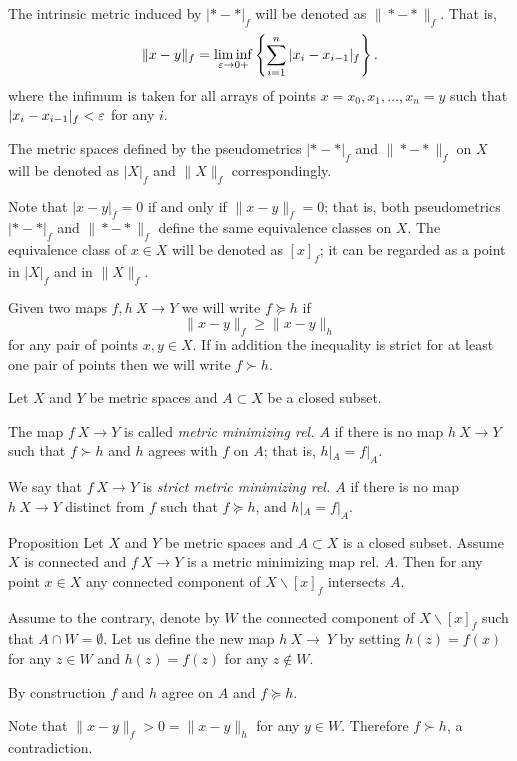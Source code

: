 \documentclass[a4paper,10pt]{amsart}
\begin{document}
The intrinsic metric induced by $|{*}-{*}|_f$ will be denoted as 
$\|{*}-{*}\|_f$. 
That is, 
\[\|x-y\|_f=\liminf_{\varepsilon\to0+}\left\{\sum_{i=1}^n|x_i-x_{i-1}|_f\right\}.\]
where the infimum is taken for all arrays of points 
$x=x_0,x_1,\dots,x_n=y$ such that 
$|x_i-x_{i-1}|_f<\varepsilon$ for any $i$.

The metric spaces defined by the pseudometrics $|{*}-{*}|_f$ 
and $\|{*}-{*}\|_f$ on $X$ will be denoted as $|X|_f$ and $\|X\|_f$ correspondingly.

Note that $|x-y|_f=0$ if and only if $\|x-y\|_f=0$;
that is,  both pseudometrics $|{*}-{*}|_f$ and  $\|{*}-{*}\|_f$
define the same equivalence classes on $X$.
The equivalence class of $x\in X$ will be denoted as $[x]_f$; 
it can be regarded as a point in  $|X|_f$ and in $\|X\|_f$.

Given two maps $f,h\:X\to Y$ we will write $f\succcurlyeq h$ if 
\[\|x-y\|_f\ge \|x-y\|_h\]
for any pair of points $x,y\in X$.
If in addition the inequality is strict for at least one pair of points then we will write $f\succ h$.

Let $X$ and $Y$ be metric spaces and $A\subset X$ be a closed subset.

The map $f\:X\to Y$ is called \emph{metric minimizing rel. $A$}
if there is no map $h\:X\to Y$ such that $f\succ h$
and $h$ agrees with $f$ on $A$;
that is, $h|_A=f|_A$.

We say that $f\:X\to Y$ is \emph{strict metric minimizing rel. $A$}
if there is no map $h\:X\to Y$ distinct from $f$
such that $f\succcurlyeq h$, 
and $h|_A=f|_A$.

\begin{thm}{Proposition}\label{prop:point-complement}
Let $X$ and $Y$ be  metric spaces 
and $A\subset X$ is a closed subset.
Assume $X$ is connected and $f\:X\to Y$ is a metric minimizing map rel. $A$.
Then for any point $x\in X$ any connected component of $X\backslash [x]_f$ intersects $A$.

\end{thm}

Assume to the contrary, denote by $W$ the connected component of $X\backslash [x]_f$ such that $A\cap W=\emptyset$.
Let us define the new map $h\:X\to\ Y$ 
by setting $h(z)=f(x)$ for any $z\in W$
and $h(z)=f(z)$ for any $z\notin W$.

By construction $f$ and $h$ agree on $A$ and $f\succcurlyeq h$.

Note that $\|x-y\|_f>0=\|x-y\|_h$ for any $y\in W$.
Therefore $f\succ h$, a contradiction.
\qeds
\end{document}
